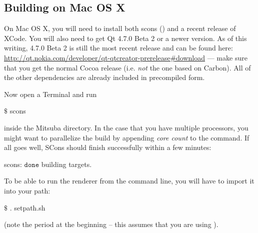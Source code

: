 \subsection{Building on Mac OS X}
On Mac OS X, you will need to install both scons () and 
a recent release of XCode. You will also need to get Qt 4.7.0 Beta 2 or a newer version.
As of this writing, 4.7.0 Beta 2 is still the most recent release and can be found here: \url{http://qt.nokia.com/developer/qt-qtcreator-prerelease#download}
--- make sure that you get the normal Cocoa release (i.e. \emph{not} the one based on Carbon). All of the
other dependencies are already included in precompiled form.

Now open a Terminal and run
\begin{shell}
$\text{\$}$ scons
\end{shell}
inside the Mitsuba directory. In the case that you have multiple processors, you might want to parallelize the build by appending \emph{core count} to the command.
If all goes well, SCons should finish successfully within a few minutes:
\begin{shell}
scons: $\texttt{done}$ building targets.
\end{shell}
To be able to run the renderer from the command line, you will have to import it into your path:
\begin{shell}
$\text{\$}$ . setpath.sh
\end{shell}
(note the period at the beginning -- this assumes that you are using ).
